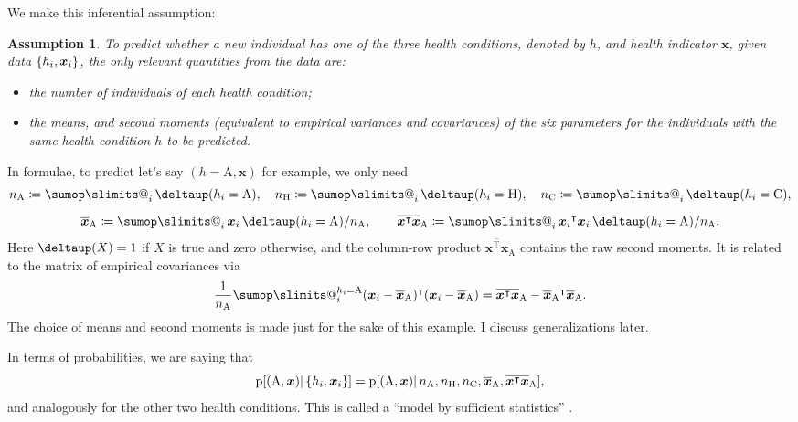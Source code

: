 \documentclass[\ifafour a4paper,12pt,\else a5paper,10pt,\fi%
onecolumn,oneside,article,%
british%
]{memoir}
\makeatletter
\theoremstyle{remark}
\theoremstyle{innote}
\def\sum{\DOTSI\sumop\slimits@}
\newcommand*{\citep}{\parencites}
\newcommand*{\delt}{\deltaup}%
\newcommand*{\defd}{\coloneqq}
\DeclarePairedDelimiter\set{\{}{\}}
\newcommand*{\pf}{\mathrm{p}}%
\renewcommand*{\|}{\mathpunct{|}}
\newcommand*{\chap}{ch.}%
\newcommand*{\tsum}{\mathop{\textstyle\sum}\nolimits}
\newcommand*{\T}{^\intercal}%
\newcommand*{\yH}{h}
\newcommand*{\yx}{x}
\newcommand*{\yxx}{\bm{\yx}}
\newcommand*{\ya}{\mathrm{A}}
\newcommand*{\yi}{\mathrm{C}}
\newcommand*{\yh}{\mathrm{H}}
\newcommand*{\yn}{n}
\newcommand*{\yna}{\yn_{\ya}}
\newcommand*{\ynh}{\yn_{\yh}}
\newcommand*{\yni}{\yn_{\yi}}
\newcommand*{\vxxa}{\overline{\yxx}_{\ya}}
\newcommand*{\vxta}{\overline{\yxx\T\yxx}_{\ya}}
\theoremstyle{plain}
\newtheorem*{assumption}{Assumption}
\makeatother
\begin{document}
We make this inferential assumption:
\begin{assumption}
  \label{thm:assumption}
  To predict whether a new individual has one of the three health
  conditions, denoted by $\yH$, and health indicator $\yxx$, given data
  $\set{\yH_i,\yxx_i}$, the only relevant quantities from the data are:
  \begin{itemize}
  \item the  number of individuals of each health condition;
  \item the means, and second moments (equivalent to empirical variances
    and covariances) of the six parameters for the individuals with the
    \emph{same} health condition $\yH$ to be predicted.
  \end{itemize}
\end{assumption}
In formulae, to predict let's say $(\yH=\ya, \yxx)$ for example, we only
need
\begin{equation}
    \label{eq:assumption}
    \begin{gathered}
      \yna \defd \tsum_i \delt(\yH_i=\ya),
\quad      \ynh \defd \tsum_i \delt(\yH_i=\yh),
\quad      \yni \defd \tsum_i \delt(\yH_i=\yi),
      \\[2\jot]
      \vxxa \defd \tsum_i \yxx_i\, \delt(\yH_i=\ya)/\yna,
\qquad      \vxta \defd \tsum_i {\yxx_i}\T\yxx_i \, \delt(\yH_i=\ya)/\yna.
    \end{gathered}
\end{equation}
Here $\delt(X)=1$ if $X$ is true and zero otherwise, and the column-row
product $\vxta$ contains the raw second moments. It is related to the
matrix of empirical covariances via
\begin{equation}
  \label{eq:raw_moments_to_covariances}
  \frac{1}{\yna}\sum_i^{\yH_i=\ya}(\yxx_i-\vxxa)\T(\yxx_i-\vxxa) =
  \vxta - {\vxxa}\T\vxxa.
\end{equation}
The choice of means and second moments is made just for the sake of this
example. I discuss generalizations later.

In terms of probabilities, we are saying that
\begin{equation}
  \label{eq:assumption_probability}
  \pf[(\ya,\yxx) \| \set{\yH_i,\yxx_i}] =
  \pf[(\ya,\yxx) \|
  \yna,\ynh,\yni,\vxxa,\vxta ],
\end{equation}
and analogously for the other two health conditions. This is called a
\enquote{model by sufficient statistics}
\citep[\chap~4]{bernardoetal1994_r2000}.


\bigskip
\end{document}
